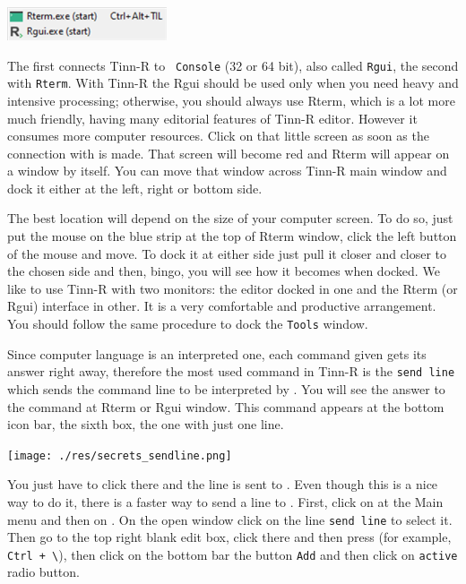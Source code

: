 \includegraphics[scale=0.50]{./res/secrets_connecting.png}

The first connects Tinn-R to \texttt{\RR{} Console} (32 or 64 bit), also called \texttt{Rgui},
the second with \texttt{Rterm}. With Tinn-R the Rgui should be used only when you need heavy and intensive processing;
otherwise, you should always use Rterm, which is a lot more much friendly, having many editorial features of Tinn-R editor.
However it consumes more computer resources. Click on that little screen as soon as the connection with \RR{} is made.
That screen will become red and Rterm will appear on a window by itself. You can move that window across Tinn-R main
window and dock it either at the left, right or bottom side.

The best location will depend on the size of your computer screen. To do so, just put the mouse on the blue strip
at the top of Rterm window, click the left button of the mouse and move.
To dock it at either side just pull it closer and closer to the chosen side and then, bingo,
you will see how it becomes when docked. We like to use Tinn-R with two monitors:
the editor docked in one and the Rterm (or Rgui) interface in other.
It is a very comfortable and productive arrangement.
You should follow the same procedure to dock the \texttt{Tools} window.

Since \RR{} computer language is an interpreted one, each command given gets its answer right away,
therefore the most used command in Tinn-R is the \texttt{send line} which sends the command line to be interpreted by \RR{}.
You will see the answer to the command at Rterm or Rgui window.
This command appears at the bottom icon bar, the sixth box, the one with just one line.

\texttt{[image: ./res/secrets\_sendline.png]}

You just have to click there and the line is sent to \RR{}. Even though this is a nice way to do it,
there is a faster way to send a line to \RR{}. First, click on \RR{} at the Main menu and then on
.
On the open window click on the line \texttt{send line} to select it.
Then go to the top right blank edit box, click there and then press (for example, \texttt{Ctrl + \textbackslash{}}),
then click on the bottom bar the button \texttt{Add} and then click on \texttt{active} radio button.

